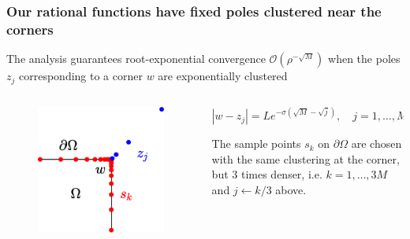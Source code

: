 \begin{frame}
\frametitle{Our rational functions have fixed poles clustered near the corners}
The analysis guarantees root-exponential convergence $\mathcal{O}(\rho^{-\sqrt{M}})$ when
the poles $z_j$ corresponding to a corner $w$ are exponentially clustered
\begin{columns}
\begin{column}{0.4\linewidth}
\begin{figure}
	\includegraphics[height=0.9\linewidth]{Figures/cluster1}
\end{figure}
\end{column}
\begin{column}{0.6\linewidth}  
\begin{equation*}
|w-z_{j}| = L e^{-\sigma(\sqrt{M}-\sqrt{j})}, \quad j=1,\ldots,M.
\end{equation*}

\bigskip
The sample points $s_k$ on $\partial\Omega$ are chosen with the same clustering at the corner, but 3 times denser, i.e. $k=1,\dots,3M$ and $j\leftarrow k/3$ above.
\end{column}
\end{columns}
\vfill
\end{frame}

